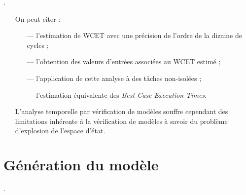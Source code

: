\documentclass[final]{beamer}
\begin{document}
\begin{frame}
\begin{textblock}{39}
\begin{block}{\thesection. \secname}
\begin{itemize}
            On peut citer :
            \begin{itemize}
              \item[—] l'estimation de WCET avec une précision de l'ordre de la dizaine de cycles ;
              \item[—] l'obtention des valeurs d'entrées associées au WCET estimé ;
              \item[—] l'application de cette analyse à des tâches non-isolées ;
              \item[—] l'estimation équivalente des \textit{Best Case Execution Times}.
            \end{itemize}
          \vspace{.5em}
          \item[] L'analyse temporelle par vérification de modèles souffre
            cependant des limitations inhérente à la vérification de modèles à
            savoir du problème d'explosion de l'espace d'état.
        \end{itemize}
        \vspace{.4em}
      \end{block}
      \vspace{1em}



      \section{Génération du modèle}
      \begin{block}{\thesection. \secname}
        

\end{block}
\end{textblock}
\end{frame}
\end{document}
